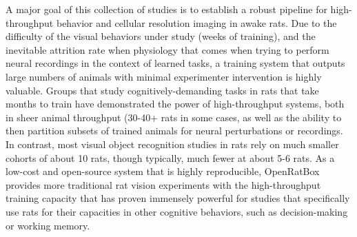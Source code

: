 A major goal of this collection of studies is to establish a robust pipeline for high-throughput behavior and cellular resolution imaging in awake rats. Due to the difficulty of the visual behaviors under study (weeks of training), and the inevitable attrition rate when physiology that comes when trying to perform neural recordings in the context of learned tasks, a training system that outputs large numbers of animals with minimal experimenter intervention is highly valuable. Groups that study cognitively-demanding tasks in rats that take months to train have demonstrated the power of high-throughput systems, both in sheer animal throughput (30-40+ rats in some cases\cite{Brunton2013, Constantinople2019}, as well as the ability to then partition subsets of trained animals for neural perturbations or recordings\cite{Erlich2011, Hanks2015, Constantinople2019}. In contrast, most visual object recognition studies in rats rely on much smaller cohorts of about 10 rats, though typically, much fewer at about 5-6 rats\cite{Zoccolan2009, Tafazoli2012, Vermaercke2012, Alemi-Neissi2013, Vinken2017}. As a low-cost and open-source system that is highly reproducible, OpenRatBox provides more traditional rat vision experiments with the high-throughput training capacity that has proven immensely powerful for studies that specifically use rats for their capacities in other cognitive behaviors, such as decision-making or working memory.







